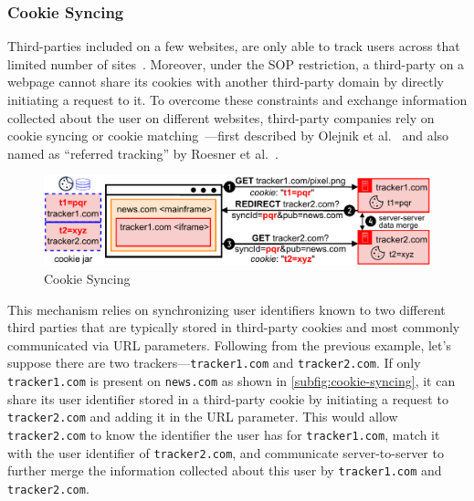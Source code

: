 \vspace{-1mm}
\subsubsection{Cookie Syncing}
Third-parties included on a few websites, are only able to track users across that limited number of sites~\cite{roesnerDetectingDefendingThirdparty2012,lernerInternetJonesRaiders2016}. 
%
Moreover, under the SOP restriction, a third-party on a webpage cannot share its cookies with another third-party domain by directly initiating a request to it.
%
To overcome these constraints and exchange information collected about the user on different websites, third-party companies rely on cookie syncing or cookie matching~\cite{acarWebNeverForgets2014,englehardtOnlineTracking1millionsite2016,bashirTracingInformationFlows2016,papadopoulosCookieSynchronizationEverything2019,fouadMissedFilterLists2020,urbanMeasuringImpactGDPR2020}---first described by Olejnik et al.~\cite{olejnikSellingPrivacyAuction2014} and also named as ``referred tracking'' by Roesner et al.~\cite{roesnerDetectingDefendingThirdparty2012}. 

\begin{figure}[htbp]
    \vspace{-3mm}
    \centering
    \includegraphics[width=1\linewidth]{figures/tracking-mechanisms-cookie-syncing.pdf}
    \caption{Cookie Syncing}
    \label{subfig:cookie-syncing}
    \vspace{-2mm}
\end{figure}

This mechanism relies on synchronizing user identifiers known to two different third parties that are typically stored in third-party cookies and most commonly communicated via URL parameters. 
%
Following from the previous example, let’s suppose there are two trackers---\texttt{tracker1.com} and \texttt{tracker2.com}. 
%
If only \texttt{tracker1.com} is present on \texttt{news.com} as shown in \autoref{subfig:cookie-syncing}, it can share its user identifier stored in a third-party cookie by initiating a request to \texttt{tracker2.com} and adding it in the URL parameter. 
%
This would allow \texttt{tracker2.com} to know the identifier the user has for \texttt{tracker1.com}, match it with the user identifier of \texttt{tracker2.com}, and communicate server-to-server to further merge the information collected about this user by \texttt{tracker1.com} and \texttt{tracker2.com}. 


